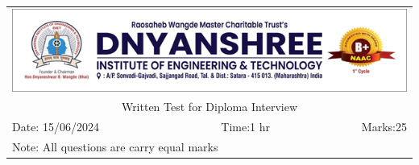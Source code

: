 \documentclass[a4, 12pt, addpoints]{exam}
\begin{document}
\def\arraystretch{1}
\begin{longtable}{lp{}p{}r}
\multicolumn{4}{c}{\includegraphics[width= \textwidth]{dietlogo}} \\ 
\multicolumn{4}{c}{Written Test for Diploma Interview} \\
Date: 15/06/2024 & \multicolumn{2}{c}{Time:1 hr} & Marks:25 \\
\multicolumn{4}{l}{ Note: All questions are carry equal marks} \\ \hline
\end{longtable}
\end{document}
